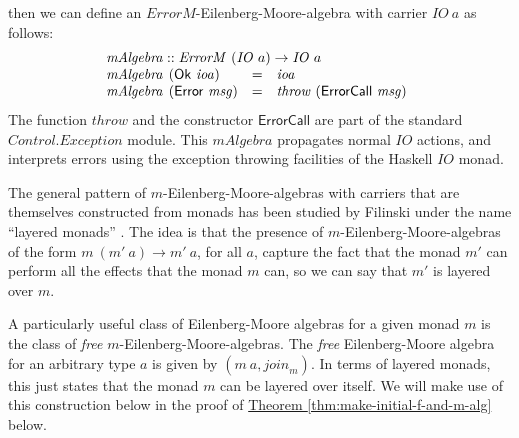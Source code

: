 \documentclass{jfp1}
\newcommand{\thmref}[1]{\hyperref[#1]{Theorem \ref*{#1}}}
\begin{document}
then we can define an $\mathit{ErrorM}$-Eilenberg-Moore-algebra with
carrier $\mathit{IO}~a$ as follows:
\begin{displaymath}
  \begin{array}{l}
    \mathit{mAlgebra} :: \mathit{ErrorM}~(\mathit{IO}~a) \to \mathit{IO}~a \\
    \begin{array}{@{}l@{\hspace{0.4em}}lcl}
      \mathit{mAlgebra}&(\mathsf{Ok}~\mathit{ioa}) & = & \mathit{ioa} \\
      \mathit{mAlgebra}&(\mathsf{Error}~\mathit{msg}) & = & \mathit{throw}~(\mathsf{ErrorCall}~\mathit{msg})
    \end{array}
  \end{array}
\end{displaymath}
The function $\mathit{throw}$ and the constructor $\mathsf{ErrorCall}$
are part of the standard $\mathit{Control.Exception}$ module. This
$\mathit{mAlgebra}$ propagates normal $\mathit{IO}$ actions, and
interprets errors using the exception throwing facilities of the
Haskell $\mathit{IO}$ monad.

The general pattern of $m$-Eilenberg-Moore-algebras with carriers that
are themselves constructed from monads has been studied by Filinski
under the name ``layered monads'' \cite{filinski99representing}. The
idea is that the presence of $m$-Eilenberg-Moore-algebras of the form
$m~(m'~a) \to m'~a$, for all $a$, capture the fact that the monad $m'$
can perform all the effects that the monad $m$ can, so we can say that
$m'$ is layered over $m$.

A particularly useful class of Eilenberg-Moore algebras for a given
monad $m$ is the class of \emph{free}
$m$-Eilenberg-Moore-algebras. The \emph{free} Eilenberg-Moore algebra
for an arbitrary type $a$ is given by $(m~a, \mathit{join}_m)$. In
terms of layered monads, this just states that the monad $m$ can be
layered over itself. We will make use of this construction below in
the proof of \thmref{thm:make-initial-f-and-m-alg} below.
\end{document}
